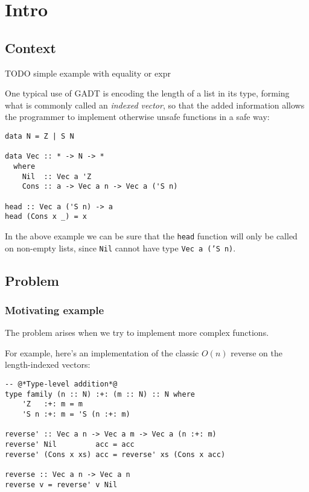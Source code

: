\chapter{Intro}
\label{cha:intro}

\section{Context}
\label{sec:context}

TODO simple example with equality or expr


One typical use of GADT is encoding the length of a list in its type, forming what is commonly called an \emph{indexed vector}, so that the added information allows the programmer to implement otherwise unsafe functions in a safe way:

\begin{lstlisting}[caption=A length-indexed vector]
data N = Z | S N

data Vec :: * -> N -> *
  where
    Nil  :: Vec a 'Z
    Cons :: a -> Vec a n -> Vec a ('S n)

head :: Vec a ('S n) -> a
head (Cons x _) = x
\end{lstlisting}

In the above example we can be sure that the \texttt{head} function will only be called on non-empty lists, since \texttt{Nil} cannot have type \texttt{Vec a ('S n)}.

\section{Problem}
\label{sec:problem}

\subsection{Motivating example}
\label{subsec:motivating-example}

The problem arises when we try to implement more complex functions.

For example, here's an implementation of the classic $O(n)$ reverse on the length-indexed vectors:

\begin{lstlisting}
-- @*Type-level addition*@
type family (n :: N) :+: (m :: N) :: N where
    'Z   :+: m = m
    'S n :+: m = 'S (n :+: m)

reverse' :: Vec a n -> Vec a m -> Vec a (n :+: m)
reverse' Nil         acc = acc
reverse' (Cons x xs) acc = reverse' xs (Cons x acc)

reverse :: Vec a n -> Vec a n
reverse v = reverse' v Nil
\end{lstlisting}

